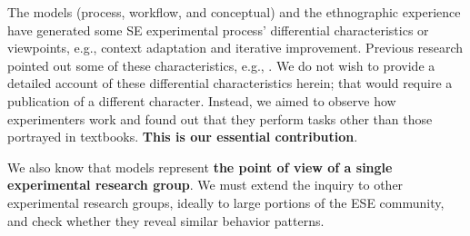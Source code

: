 The models (process, workflow, and conceptual) and the ethnographic experience have generated some SE experimental process' differential characteristics or viewpoints, e.g., context adaptation and iterative improvement. Previous research pointed out some of these characteristics, e.g., \cite{Mohamed-1993-roles-ESE,Sjoberg-2005-survey-experiments-SE,Shull-2004-Knowledge-sharing-issues-SE}. We do not wish to provide a detailed account of these differential characteristics herein; that would require a publication of a different character. Instead, we aimed to observe how experimenters work and found out that they perform tasks other than those portrayed in textbooks. \textbf{This is our essential contribution}.

We also know that models represent \textbf{the point of view of a single experimental research group}. We must extend the inquiry to other experimental research groups, ideally to large portions of the ESE community, and check whether they reveal similar behavior patterns.